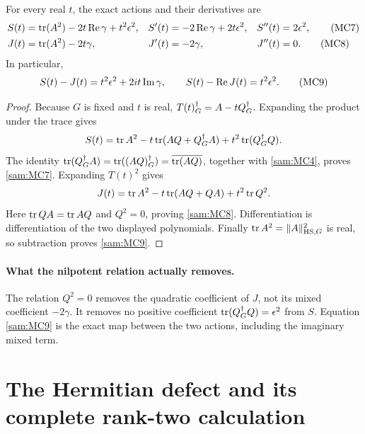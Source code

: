 \begin{samtheorem}
For every real \(t\), the exact actions and their derivatives are
\begin{align}
 S(t)&=\operatorname{tr}(A^2)-2t\operatorname{Re}\gamma+t^2\epsilon^2,
 & S'(t)&=-2\operatorname{Re}\gamma+2t\epsilon^2,
 & S''(t)&=2\epsilon^2, \tag{MC7}\label{sam:MC7}\\
 J(t)&=\operatorname{tr}(A^2)-2t\gamma,
 & J'(t)&=-2\gamma,
 & J''(t)&=0. \tag{MC8}\label{sam:MC8}
\end{align}
In particular,
\begin{equation}
 S(t)-J(t)=t^2\epsilon^2+2it\operatorname{Im}\gamma,\qquad
 S(t)-\operatorname{Re} J(t)=t^2\epsilon^2.
 \tag{MC9}\label{sam:MC9}
\end{equation}
\end{samtheorem}
\begin{proof}
Because \(G\) is fixed and \(t\) is real,
\(T(t)^\dagger_G=A-tQ^\dagger_G\). Expanding the product under the trace gives
\[
 S(t)=\operatorname{tr} A^2-t\operatorname{tr}(AQ+Q^\dagger_G A)+t^2\operatorname{tr}(Q^\dagger_G Q).
\]
The identity
\(\operatorname{tr}(Q^\dagger_G A)=\operatorname{tr}((AQ)^\dagger_G)=\overline{\operatorname{tr}(AQ)}\),
together with \eqref{sam:MC4}, proves \eqref{sam:MC7}. Expanding \(T(t)^2\)
gives
\[
 J(t)=\operatorname{tr} A^2-t\operatorname{tr}(AQ+QA)+t^2\operatorname{tr} Q^2.
\]
Here \(\operatorname{tr} QA=\operatorname{tr} AQ\) and \(Q^2=0\), proving \eqref{sam:MC8}.
Differentiation is differentiation of the two displayed polynomials.
Finally \(\operatorname{tr} A^2=\|A\|_{\mathrm{HS},G}^2\) is real, so subtraction
proves \eqref{sam:MC9}.
\end{proof}

\paragraph{What the nilpotent relation actually removes.}
The relation \(Q^2=0\) removes the quadratic coefficient of \(J\), not
its mixed coefficient \(-2\gamma\). It removes no positive coefficient
\(\operatorname{tr}(Q^\dagger_G Q)=\epsilon^2\) from \(S\). Equation \eqref{sam:MC9} is
the exact map between the two actions, including the imaginary mixed term.

\section{The Hermitian defect and its complete rank-two calculation}

